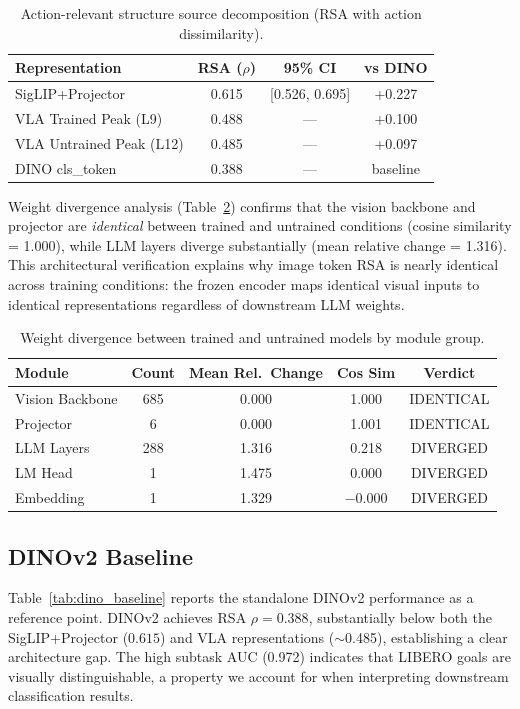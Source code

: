 \documentclass[10pt,letterpaper]{article}
\begin{document}
\begin{table}[h]
\centering
\caption{Action-relevant structure source decomposition (RSA with action dissimilarity).}
\label{tab:rsa_source}
\begin{tabular}{lccc}
\toprule
Representation & RSA ($\rho$) & 95\% CI & vs DINO \\
\midrule
SigLIP+Projector & 0.615 & {[0.526, 0.695]} & +0.227 \\
VLA Trained Peak (L9) & 0.488 & --- & +0.100 \\
VLA Untrained Peak (L12) & 0.485 & --- & +0.097 \\
DINO cls\_token & 0.388 & --- & baseline \\
\bottomrule
\end{tabular}
\end{table}

Weight divergence analysis (Table~\ref{tab:weight_div}) confirms that the vision backbone and projector are \emph{identical} between trained and untrained conditions (cosine similarity = 1.000), while LLM layers diverge substantially (mean relative change = 1.316). This architectural verification explains why image token RSA is nearly identical across training conditions: the frozen encoder maps identical visual inputs to identical representations regardless of downstream LLM weights.

\begin{table}[h]
\centering
\caption{Weight divergence between trained and untrained models by module group.}
\label{tab:weight_div}
\begin{tabular}{lcccc}
\toprule
Module & Count & Mean Rel.\ Change & Cos Sim & Verdict \\
\midrule
Vision Backbone & 685 & 0.000 & 1.000 & IDENTICAL \\
Projector & 6 & 0.000 & 1.001 & IDENTICAL \\
LLM Layers & 288 & 1.316 & 0.218 & DIVERGED \\
LM Head & 1 & 1.475 & 0.000 & DIVERGED \\
Embedding & 1 & 1.329 & $-$0.000 & DIVERGED \\
\bottomrule
\end{tabular}
\end{table}

\subsection{DINOv2 Baseline}

Table~\ref{tab:dino_baseline} reports the standalone DINOv2 performance as a reference point. DINOv2 achieves RSA $\rho = 0.388$, substantially below both the SigLIP+Projector ($0.615$) and VLA representations ($\sim$0.485), establishing a clear architecture gap. The high subtask AUC (0.972) indicates that LIBERO goals are visually distinguishable, a property we account for when interpreting downstream classification results.
\end{document}
